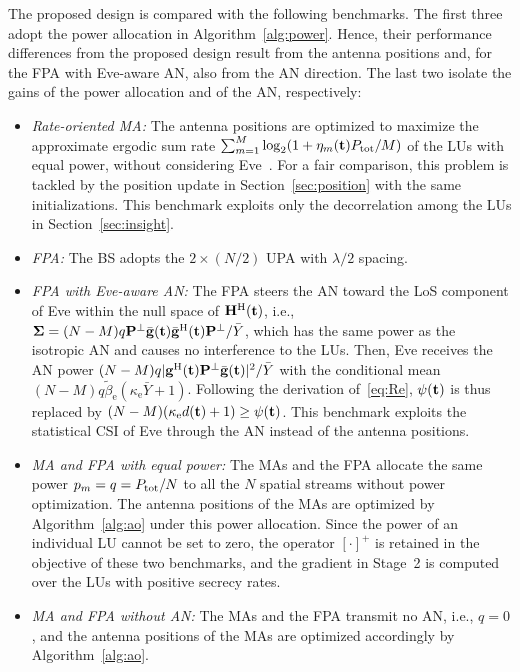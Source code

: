 \documentclass[journal]{IEEEtran}
\newcommand{\rev}[1]{{\color{red}#1}}
\newcommand{\rev}[1]{#1}
\begin{document}
The proposed design is compared with the following benchmarks. The first three adopt the power allocation in Algorithm~\ref{alg:power}. Hence, their performance differences from the proposed design result from the antenna positions and, for the FPA with Eve-aware AN, also from the AN direction. The last two isolate the gains of the power allocation and of the AN, respectively:
\begin{itemize}
\item \textit{Rate-oriented MA:} The antenna positions \rev{are optimized to} maximize the approximate ergodic sum rate $\sum_{m=1}^M\log_2(1+\eta_m(\mathbf{t})P_{\mathrm{tot}}/M)$ of the LUs with equal power\rev{, without considering} Eve~\cite{ZhengTCOM2025}. For a fair comparison, this problem is tackled by the position update in Section~\ref{sec:position} with the same initializations. This benchmark exploits only the decorrelation among the LUs in Section~\ref{sec:insight}.
\item \textit{FPA:} The BS adopts the $2\times(N/2)$ UPA with $\lambda/2$ spacing.
\item \textit{FPA with Eve-aware AN:} The FPA steers the AN toward the LoS component of Eve within the null space of $\mathbf{H}^{\mathrm H}(\mathbf{t})$, i.e., $\boldsymbol{\Sigma}=(N-M)q\mathbf{P}^{\perp}\bar{\mathbf{g}}(\mathbf{t})\bar{\mathbf{g}}^{\mathrm H}(\mathbf{t})\mathbf{P}^{\perp}/\bar Y$, which has the same power as the isotropic AN and causes no interference to the LUs. Then, Eve receives the AN power $(N-M)q|\mathbf{g}^{\mathrm H}(\mathbf{t})\mathbf{P}^{\perp}\bar{\mathbf{g}}(\mathbf{t})|^2/\bar Y$ with the conditional mean $(N-M)q\tilde\beta_{\mathrm e}(\kappa_{\mathrm e}\bar Y+1)$. Following the derivation of~\eqref{eq:Re}, $\psi(\mathbf{t})$ is thus replaced by $(N-M)(\kappa_{\mathrm e}d(\mathbf{t})+1)\ge\psi(\mathbf{t})$. This benchmark exploits the statistical CSI of Eve through the AN instead of the antenna positions.
\item \textit{MA and FPA with equal power:} The MAs and the FPA allocate the same power $p_m=q=P_{\mathrm{tot}}/N$ to all the $N$ spatial streams without power optimization. The antenna positions of the MAs are optimized by Algorithm~\ref{alg:ao} under this power allocation. Since the power of an individual LU cannot be set to zero, the operator $[\cdot]^+$ is retained in the objective of these two benchmarks, and the gradient in Stage~2 is computed over the LUs with positive secrecy rates.
\item \textit{MA and FPA without AN:} The MAs and the FPA transmit no AN, i.e., $q=0$, and the antenna positions of the MAs are optimized accordingly by Algorithm~\ref{alg:ao}.
\end{itemize}
\end{document}
